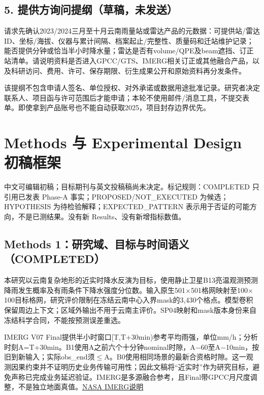 \documentclass[UTF8,fontset=fandol,10pt]{ctexart}
\begin{document}
\subsection{5. 提供方询问提纲（草稿，未发送）}

请求先确认2023/\allowbreak{}2024三月至十月云南雨量站或雷达产品的元数据：可提供站/\allowbreak{}雷达ID、坐标/\allowbreak{}海拔、仪器与累计间隔、档案起止/\allowbreak{}完整性、质量码和迁站维护记录；能否提供分钟或恰当半小时降水量；雷达是否有volume/\allowbreak{}QPE及beam遮挡、订正站清单。请说明资料是否进入GPCC/\allowbreak{}GTS、IMERG相关订正或其他融合产品，以及科研访问、费用、许可、保存期限、衍生成果公开和原始资料再分发条件。

该提纲不包含申请人签名、单位授权、对外承诺或数据用途批准记录。研究者决定联系人、项目函与许可范围后才能申请；本轮不使用邮件/\allowbreak{}消息工具，不提交表单。即使拿到产品账号也不能自动获取2025，项目封存边界优先。
\clearpage\section{Methods 与 Experimental Design 初稿框架}

中文可编辑初稿；目标期刊与英文投稿稿尚未决定。标记规则：COMPLETED 只引用已发表 Phase-A 事实；PROPOSED/\allowbreak{}NOT\_\allowbreak{}EXECUTED 为候选；HYPOTHESIS 为待检验解释；EXPECTED\_\allowbreak{}PATTERN 表示用于否证的可能方向，不是已测结果。没有新 Results、没有新增指标数值。

\subsection{Methods 1：研究域、目标与时间语义（COMPLETED）}

本研究以云南复杂地形的近实时降水反演为目标，使用静止卫星B13亮温观测预测降雨发生概率及有雨条件下降水强度分位数。输入原生501\(\times\)501格网映射至100\(\times\)100目标格网，研究评价限制在冻结云南中心入界mask的3,430个格点。模型卷积保留周边上下文；区域外输出不用于云南主评价。SP04映射和mask版本身份来自冻结科学合同，不能按预测误差重选。

IMERG V07 Final提供半小时窗口[T,T+30min)参考平均雨强，单位mm/\allowbreak{}h；分析时刻A=T+30min。B1使用A之前六个十分钟nominal时隙，A\(-\)60至A\(-\)10min，按旧到新输入；实际obs\_\allowbreak{}end须\(\le\)A。B0使用相同场景的最新合资格时隙。这一观测因果约束并不证明历史业务传输可用性；因此文稿将“近实时”作为研究目标，避免声称已完成业务延迟验证。IMERG是多源融合参考，且Final带GPCC月尺度调整，不是独立地面真值。\href{https://gpm.nasa.gov/data/imerg}{NASA IMERG说明}
\end{document}
